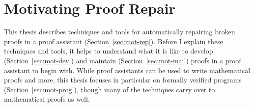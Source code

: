 \chapter{Motivating Proof Repair}

This thesis describes techniques and tools for automatically repairing broken proofs in a proof assistant (Section~\ref{sec:mot-rep}).
Before I explain these techniques and tools, it helps to understand what it is like to develop (Section~\ref{sec:mot-dev}) and maintain (Section~\ref{sec:mot-mai}) proofs in a proof assistant to begin with.
While proof assistants can be used to write mathematical proofs and more,
this thesis focuses in particular on formally verified programs (Section~\ref{sec:mot-prog}), though many of the techniques carry over to mathematical proofs as well.








